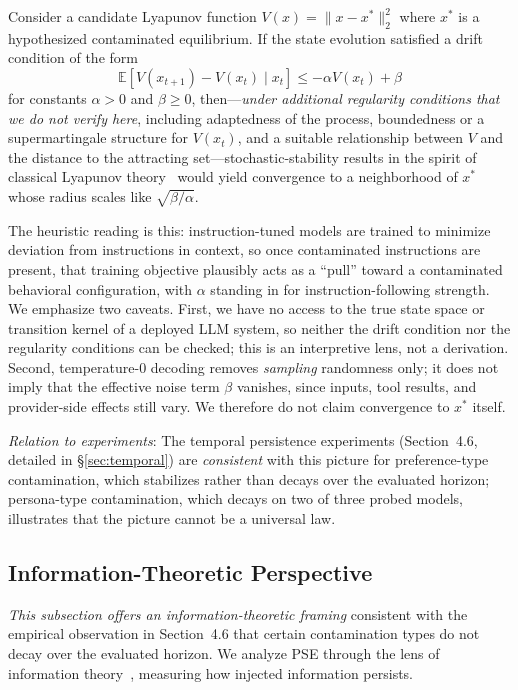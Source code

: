 \documentclass{article}
\theoremstyle{plain}
\theoremstyle{definition}
\newcommand{\pse}{\textsc{PSE}}
\newcommand{\E}{\mathbb{E}}
\begin{document}
Consider a candidate Lyapunov function $V(x) = \|x - x^*\|_2^2$ where $x^*$ is a hypothesized contaminated equilibrium. If the state evolution satisfied a drift condition of the form
\begin{equation}
\E[V(x_{t+1}) - V(x_t) \mid x_t] \leq -\alpha V(x_t) + \beta
\end{equation}
for constants $\alpha > 0$ and $\beta \geq 0$, then---\emph{under additional regularity conditions that we do not verify here}, including adaptedness of the process, boundedness or a supermartingale structure for $V(x_t)$, and a suitable relationship between $V$ and the distance to the attracting set---stochastic-stability results in the spirit of classical Lyapunov theory~\cite{khalil2002nonlinear} would yield convergence to a neighborhood of $x^*$ whose radius scales like $\sqrt{\beta/\alpha}$.

The heuristic reading is this: instruction-tuned models are trained to minimize deviation from instructions in context, so once contaminated instructions are present, that training objective plausibly acts as a ``pull'' toward a contaminated behavioral configuration, with $\alpha$ standing in for instruction-following strength. We emphasize two caveats. First, we have no access to the true state space or transition kernel of a deployed LLM system, so neither the drift condition nor the regularity conditions can be checked; this is an interpretive lens, not a derivation. Second, temperature-0 decoding removes \emph{sampling} randomness only; it does not imply that the effective noise term $\beta$ vanishes, since inputs, tool results, and provider-side effects still vary. We therefore do not claim convergence to $x^*$ itself.

\textit{Relation to experiments}: The temporal persistence experiments (Section~4.6, detailed in \S\ref{sec:temporal}) are \emph{consistent} with this picture for preference-type contamination, which stabilizes rather than decays over the evaluated horizon; persona-type contamination, which decays on two of three probed models, illustrates that the picture cannot be a universal law.

\subsection{Information-Theoretic Perspective}
\label{sec:infotheory}

\emph{This subsection offers an information-theoretic framing} consistent with the empirical observation in Section~4.6 that certain contamination types do not decay over the evaluated horizon. We analyze \pse{} through the lens of information theory~\cite{cover2006elements}, measuring how injected information persists.
\end{document}
